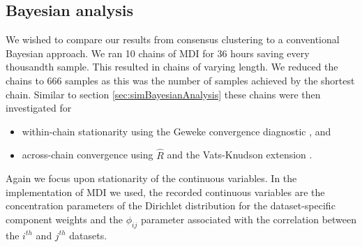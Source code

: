 \documentclass[]{article}
\begin{document}
\subsection{Bayesian analysis} \label{sec:yeastBayesianAnalysis}
We wished to compare our results from consensus clustering to a conventional Bayesian approach. We ran 10 chains of MDI for 36 hours saving every thousandth sample. This resulted in chains of varying length. We reduced the chains to 666 samples as this was the number of samples achieved by the shortest chain. Similar to section \ref{sec:simBayesianAnalysis} these chains were then investigated for 
\begin{itemize}
	\item within-chain stationarity using the Geweke convergence diagnostic \citep{geweke1991evaluating}, and
	\item across-chain convergence using $\hat{R}$ \citep{gelman1992inference} and the Vats-Knudson extension \citep[\emph{stable $\hat{R}$},][]{vats2018revisiting}.
\end{itemize}
%
%
Again we focus upon stationarity of the continuous variables. In the implementation of MDI we used, the recorded continuous variables are the concentration parameters of the Dirichlet distribution for the dataset-specific component weights and the $\phi_{ij}$ parameter associated with the correlation between the $i^{th}$ and $j^{th}$ datasets. 
\end{document}
